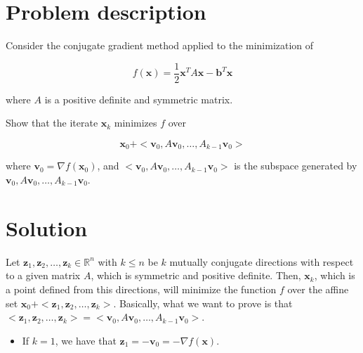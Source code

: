 \documentclass[11pt,a4paper]{article}
\begin{document}
\setlength{\parskip}{1em}


\section{Problem description}

Consider the conjugate gradient method applied to the minimization of

\[
  f(\mathbf{x}) = \frac{1}{2} \mathbf{x}^TA\mathbf{x} - \mathbf{b}^T\mathbf{x}
\]

\noindent where $A$ is a positive definite and symmetric matrix.

\noindent Show that the iterate $\mathbf{x}_k$ minimizes $f$ over

\[
  \mathbf{x}_0 + < \mathbf{v}_0, A\mathbf{v}_0, \dots , A_{k-1}\mathbf{v}_0 >
\]

\noindent where $\mathbf{v}_0 = \nabla f(\mathbf{x}_0)$, and
$< \mathbf{v}_0, A\mathbf{v}_0, \dots , A_{k-1}\mathbf{v}_0 >$ is the subspace generated
by $\mathbf{v}_0, A\mathbf{v}_0, \dots , A_{k-1}\mathbf{v}_0$.

\section{Solution}

Let $\mathbf{z}_1, \mathbf{z}_2, \dots, \mathbf{z}_k \in \mathbb{R}^n$ with $k \leq n$ be
$k$ mutually conjugate directions with respect to a given matrix $A$, which is symmetric and
positive definite. Then, $\mathbf{x}_k$, which is a point defined from this directions, will
minimize the function $f$ over the affine set
$\mathbf{x}_0 + < \mathbf{z}_1, \mathbf{z}_2, \dots, \mathbf{z}_k >$. Basically, what we
want to prove is that
$< \mathbf{z}_1, \mathbf{z}_2, \dots, \mathbf{z}_k > = < \mathbf{v}_0, A\mathbf{v}_0, \dots , A_{k-1}\mathbf{v}_0 >$.

\begin{itemize}
  \item If $k = 1$, we have that $\mathbf{z}_1 = -\mathbf{v}_0 = -\nabla f(\mathbf{x})$.
\end{itemize}
\end{document}
